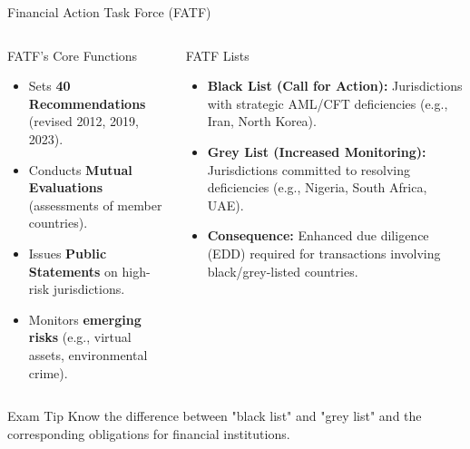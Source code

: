 \documentclass{beamer}
\begin{document}
	\begin{frame}{Financial Action Task Force (FATF)}
		\begin{columns}[T]
			\begin{alertblock}{FATF's Core Functions}
				\begin{itemize}
					\item Sets \textbf{40 Recommendations} (revised 2012, 2019, 2023).
					\item Conducts \textbf{Mutual Evaluations} (assessments of member countries).
					\item Issues \textbf{Public Statements} on high-risk jurisdictions.
					\item Monitors \textbf{emerging risks} (e.g., virtual assets, environmental crime).
				\end{itemize}
			\end{alertblock}
			\begin{exampleblock}{FATF Lists}
				\begin{itemize}
					\item \textbf{Black List (Call for Action):} Jurisdictions with strategic AML/CFT deficiencies (e.g., Iran, North Korea).
					\item \textbf{Grey List (Increased Monitoring):} Jurisdictions committed to resolving deficiencies (e.g., Nigeria, South Africa, UAE).
					\item \textbf{Consequence:} Enhanced due diligence (EDD) required for transactions involving black/grey-listed countries.
				\end{itemize}
			\end{exampleblock}
		\end{columns}
		\begin{block}{Exam Tip}
			Know the difference between "black list" and "grey list" and the corresponding obligations for financial institutions.
		\end{block}
	\end{frame}
	
\end{document}
